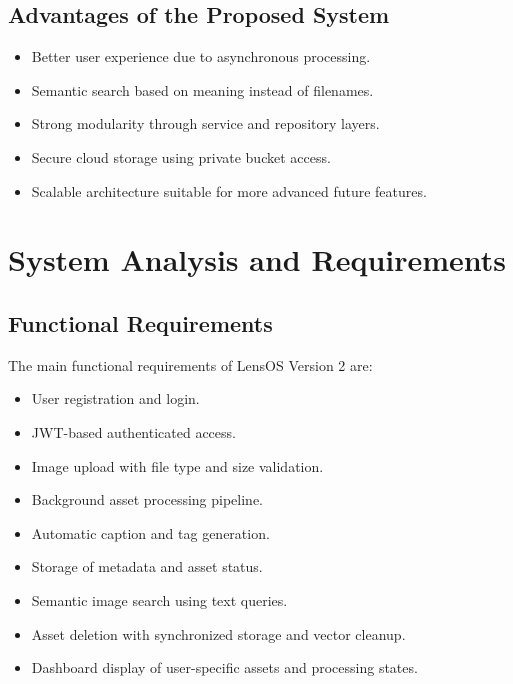 \documentclass[12pt,a4paper]{report}
\begin{document}
\section{Advantages of the Proposed System}
\begin{itemize}[leftmargin=*]
    \item Better user experience due to asynchronous processing.
    \item Semantic search based on meaning instead of filenames.
    \item Strong modularity through service and repository layers.
    \item Secure cloud storage using private bucket access.
    \item Scalable architecture suitable for more advanced future features.
\end{itemize}

\chapter{System Analysis and Requirements}
\section{Functional Requirements}
The main functional requirements of LensOS Version 2 are:
\begin{itemize}[leftmargin=*]
    \item User registration and login.
    \item JWT-based authenticated access.
    \item Image upload with file type and size validation.
    \item Background asset processing pipeline.
    \item Automatic caption and tag generation.
    \item Storage of metadata and asset status.
    \item Semantic image search using text queries.
    \item Asset deletion with synchronized storage and vector cleanup.
    \item Dashboard display of user-specific assets and processing states.
\end{itemize}
\end{document}
